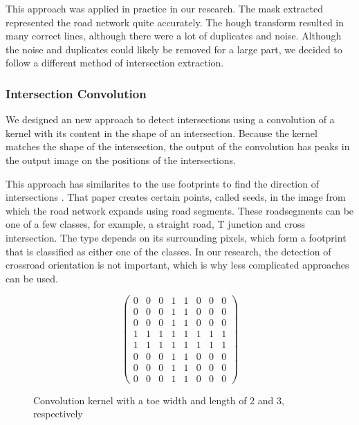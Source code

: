 This approach was applied in practice in our research. The mask extracted
represented the road network quite accurately. The hough transform resulted in
many correct lines, although there were a lot of duplicates and noise. Although
the noise and duplicates could likely be removed for a large part, we decided
to follow a different method of intersection extraction. 



\subsubsection{Intersection Convolution}
We designed an new approach to detect intersections using a convolution of
a kernel with its content in the shape of an intersection. Because the kernel
matches the shape of the intersection, the output of the convolution has peaks
in the output image on the positions of the intersections.

This approach has similarites to the use footprints to find the direction of
intersections \cite{hu2007road}. That paper creates certain points, called
seeds, in the image from which the road network expands using road segments.
These roadsegments can be one of a few classes, for example, a straight road,
T junction and cross intersection. The type depends on its surrounding pixels,
which form a footprint that is classified as either one of the classes. In our
research, the detection of crossroad orientation is not important, which is why
less complicated approaches can be used.

\begin{figure}
\[
 \begin{pmatrix}
 0 & 0 & 0 & 1 & 1 & 0 & 0 & 0\\
 0 & 0 & 0 & 1 & 1 & 0 & 0 & 0\\
 0 & 0 & 0 & 1 & 1 & 0 & 0 & 0\\
 1 & 1 & 1 & 1 & 1 & 1 & 1 & 1\\
 1 & 1 & 1 & 1 & 1 & 1 & 1 & 1\\
 0 & 0 & 0 & 1 & 1 & 0 & 0 & 0\\
 0 & 0 & 0 & 1 & 1 & 0 & 0 & 0\\
 0 & 0 & 0 & 1 & 1 & 0 & 0 & 0
 \end{pmatrix}
\] 
\caption{Convolution kernel with a toe width and length of 2 and 3,
respectively}
\label{fig:conv_kernel}
\end{figure}


